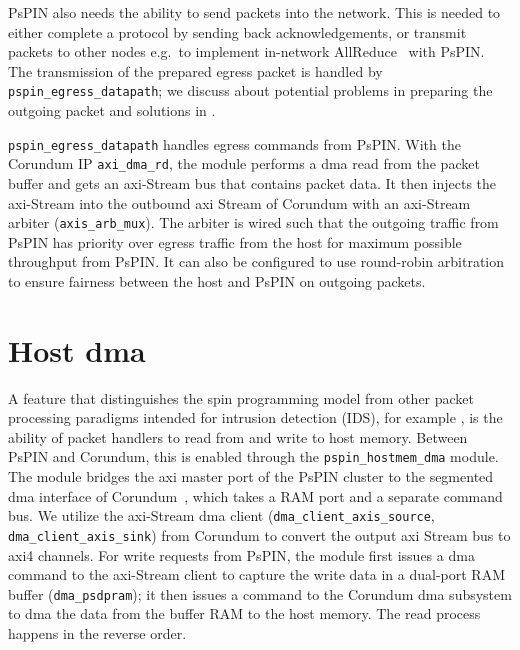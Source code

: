 PsPIN also needs the ability to send packets into the network.  This is needed to either complete a protocol by sending back acknowledgements, or transmit packets to other nodes e.g.\ to implement in-network AllReduce~\cite{de_sensi_flare_2021} with PsPIN.  The transmission of the prepared egress packet is handled by \texttt{pspin\_\-egress\_\-datapath}; we discuss about potential problems in preparing the outgoing packet and solutions in .

\texttt{pspin\_\-egress\_\-datapath} handles egress commands from PsPIN.  With the Corundum IP \texttt{axi\_\-dma\_\-rd}, the module performs a \ac{dma} read from the packet buffer and gets an \ac{axi}-Stream bus that contains packet data.  It then injects the \ac{axi}-Stream into the outbound \ac{axi} Stream of Corundum with an \ac{axi}-Stream arbiter (\texttt{axis\_arb\_mux}).  The arbiter is wired such that the outgoing traffic from PsPIN has priority over egress traffic from the host for maximum possible throughput from PsPIN.  It can also be configured to use round-robin arbitration to ensure fairness between the host and PsPIN on outgoing packets.


\section{Host \acs{dma}}

A feature that distinguishes the \ac{spin} programming model from other packet processing paradigms intended for intrusion detection (IDS), for example \cite{khazraee_rosebud_2023}, is the ability of packet handlers to read from and write to host memory.  Between PsPIN and Corundum, this is enabled through the \texttt{pspin\_hostmem\_dma} module.  The module bridges the \ac{axi} master port of the PsPIN cluster to the segmented \ac{dma} interface of Corundum~\cite{forencich_verilog_2023}, which takes a RAM port and a separate command bus.  We utilize the \ac{axi}-Stream \ac{dma} client (\texttt{dma\_\-client\_\-axis\_\-source}, \texttt{dma\_\-client\_\-axis\_\-sink}) from Corundum to convert the output \ac{axi} Stream bus to \ac{axi}4 channels.  For write requests from PsPIN, the module first issues a \ac{dma} command to the \ac{axi}-Stream client to capture the write data in a dual-port RAM buffer (\texttt{dma\_\-psdpram}); it then issues a command to the Corundum \ac{dma} subsystem to \ac{dma} the data from the buffer RAM to the host memory.  The read process happens in the reverse order.

